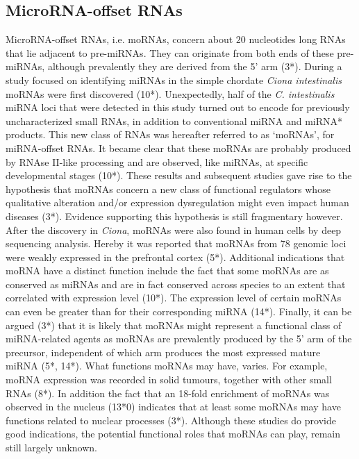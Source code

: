 \documentclass[graybox]{svmult}
\begin{document}
\subsection{MicroRNA-offset RNAs}
MicroRNA-offset RNAs, i.e. moRNAs, concern about $20$ nucleotides long RNAs 
that lie adjacent to pre-miRNAs. They can originate from both ends of these 
pre-miRNAs, although prevalently they are derived from the 5’ arm (3*). 
During a study focused on identifying miRNAs in the simple chordate 
\textit{Ciona intestinalis} moRNAs were first discovered (10*). Unexpectedly, 
half of the \textit{C. intestinalis} miRNA loci that were detected in this 
study turned out to encode for previously uncharacterized small RNAs, in 
addition to conventional miRNA and miRNA* products. This new class of RNAs was 
hereafter referred to as ‘moRNAs’, for miRNA-offset RNAs. It became clear that 
these moRNAs are probably produced by RNAse II-like processing and are observed, 
like miRNAs, at specific developmental stages (10*).
 These results and subsequent studies gave rise to the hypothesis that moRNAs 
concern  a new class of functional regulators whose qualitative alteration 
and/or expression dysregulation might even impact human diseases (3*). Evidence 
supporting this hypothesis is still fragmentary however. After the discovery in 
\textit{Ciona}, moRNAs were also found in human cells by deep sequencing 
analysis. Hereby it was reported that moRNAs from 78 genomic loci were weakly 
expressed in the prefrontal cortex (5*). Additional indications that moRNA have 
a distinct function include the fact that some moRNAs are as conserved as miRNAs 
and are in fact conserved across species to an extent that correlated with 
expression level (10*). The expression level of certain moRNAs can even be 
greater than for their corresponding miRNA (14*). Finally, it can be argued (3*) 
that it is likely that moRNAs might represent a functional class of 
miRNA-related agents as moRNAs are prevalently produced by the 5’ arm of the 
precursor, independent of which arm produces the most expressed mature miRNA 
(5*, 14*). 
What functions moRNAs may have, varies. For example, moRNA expression was 
recorded in solid tumours, together with other small RNAs (8*). In addition the 
fact that an 18-fold enrichment of moRNAs was observed in the nucleus (13*0) 
indicates that at least some moRNAs may have functions related to nuclear 
processes (3*). Although these studies do provide good indications, the 
potential functional roles that moRNAs can play, remain still largely unknown. 
\end{document}
